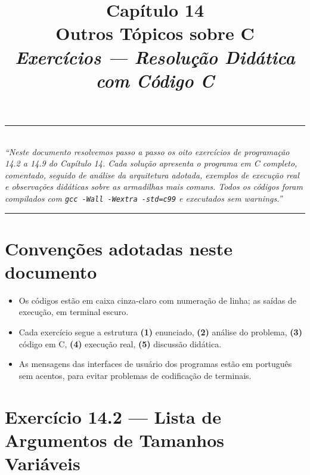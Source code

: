 \documentclass[11pt,a4paper]{article}
\title{
  \vspace{-1cm}
  {\Huge\bfseries\color{deitelblue} Cap\'itulo 14}\\[0.3em]
  {\Large\bfseries Outros T\'opicos sobre C}\\[0.8em]
  {\large\itshape Exerc\'icios --- Resolu\c{c}\~ao Did\'atica com C\'odigo C}
}
\author{}
\date{}
\begin{document}
\maketitle
\thispagestyle{empty}
\vspace{-2em}

\begin{center}
\rule{0.85\textwidth}{0.5pt}\\[0.4em]
\textit{``Neste documento resolvemos passo a passo os oito exerc\'icios de programa\c{c}\~ao 14.2 a 14.9 do Cap\'itulo 14. Cada solu\c{c}\~ao apresenta o programa em C completo, comentado, seguido de an\'alise da arquitetura adotada, exemplos de execu\c{c}\~ao real e observa\c{c}\~oes did\'aticas sobre as armadilhas mais comuns. Todos os c\'odigos foram compilados com \texttt{gcc -Wall -Wextra -std=c99} e executados sem warnings.''}\\[0.4em]
\rule{0.85\textwidth}{0.5pt}
\end{center}

\vspace{1em}

\section*{Conven\c{c}\~oes adotadas neste documento}

\begin{itemize}[leftmargin=*]
  \item Os c\'odigos est\~ao em caixa cinza-claro com numera\c{c}\~ao de linha; as sa\'idas de execu\c{c}\~ao, em terminal escuro.
  \item Cada exerc\'icio segue a estrutura \textbf{(1)} enunciado, \textbf{(2)} an\'alise do problema, \textbf{(3)} c\'odigo em C, \textbf{(4)} execu\c{c}\~ao real, \textbf{(5)} discuss\~ao did\'atica.
  \item As mensagens das interfaces de usu\'ario dos programas est\~ao em portugu\^es sem acentos, para evitar problemas de codifica\c{c}\~ao de terminais.
\end{itemize}

\section{Exerc\'icio 14.2 --- Lista de Argumentos de Tamanhos Vari\'aveis}
\end{document}
